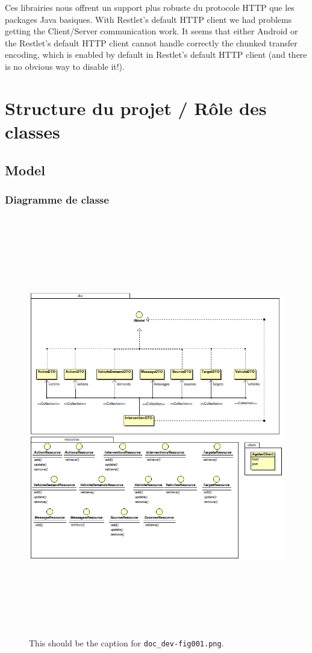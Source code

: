\documentclass{article}
\begin{document}
Ces librairies nous offrent un support plus robuste du protocole 
HTTP que les packages Java basiques. With Restlet's default HTTP client we had 
problems getting the Client/Server communication work. It seems that either Android 
or the Restlet's default HTTP client cannot handle correctly the chunked transfer 
encoding, which is enabled by default in Restlet's default HTTP client (and there 
is no obvious way to disable it!).

\section{Structure du projet / Rôle des classes}

\subsection{Model}


\subsubsection{Diagramme de classe}

\begin{figure}[htbp]
\begin{center}
\includegraphics[width=494pt, height=521pt]{doc_dev-fig001.png}
\caption{This should be the caption for \texttt{doc\_dev-fig001.png}.}
\end{center}
\end{figure}
\end{document}

